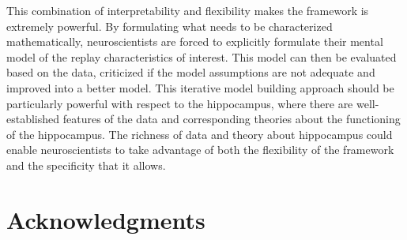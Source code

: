 \documentclass[conference]{IEEEtran}
\begin{document}
This combination of interpretability and flexibility makes the framework is extremely powerful. By formulating what needs to be characterized mathematically, neuroscientists are forced to explicitly formulate their mental model of the replay characteristics of interest. This model can then be evaluated based on the data, criticized if the model assumptions are not adequate and improved into a better model. This iterative model building approach should be particularly powerful with respect to the hippocampus, where there are well-established features of the data and corresponding theories about the functioning of the hippocampus. The richness of data and theory about hippocampus could enable neuroscientists to take advantage of both the flexibility of the framework and the specificity that it allows.


\section*{Acknowledgments}
\printbibliography
\end{document}
